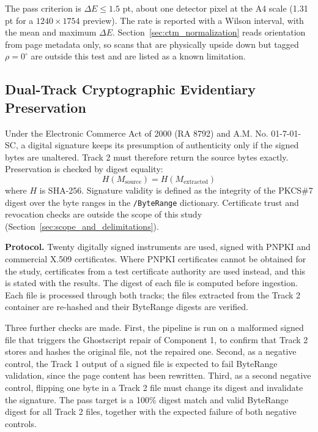 The pass criterion is $\Delta E \le 1.5$ pt, about one detector pixel at the A4 scale (1.31 pt for a $1240 \times 1754$ preview). The rate is reported with a Wilson interval, with the mean and maximum $\Delta E$. Section~\ref{sec:ctm_normalization} reads orientation from page metadata only, so scans that are physically upside down but tagged $\rho=0^\circ$ are outside this test and are listed as a known limitation.

\subsection{Dual-Track Cryptographic Evidentiary Preservation}
\label{sec:eval_crypto_preservation}

Under the Electronic Commerce Act of 2000 (RA 8792) and A.M. No. 01-7-01-SC, a digital signature keeps its presumption of authenticity only if the signed bytes are unaltered. Track 2 must therefore return the source bytes exactly. Preservation is checked by digest equality:
\begin{equation}
\label{eq:preservation_digest}
H(M_{\text{source}})=H(M_{\text{extracted}})
\end{equation}
where $H$ is SHA-256. Signature validity is defined as the integrity of the PKCS\#7 digest over the byte ranges in the \texttt{/ByteRange} dictionary. Certificate trust and revocation checks are outside the scope of this study (Section~\ref{sec:scope_and_delimitations}).

\textbf{Protocol.} Twenty digitally signed instruments are used, signed with PNPKI and commercial X.509 certificates. Where PNPKI certificates cannot be obtained for the study, certificates from a test certificate authority are used instead, and this is stated with the results. The digest of each file is computed before ingestion. Each file is processed through both tracks; the files extracted from the Track 2 container are re-hashed and their ByteRange digests are verified.

Three further checks are made. First, the pipeline is run on a malformed signed file that triggers the Ghostscript repair of Component 1, to confirm that Track 2 stores and hashes the original file, not the repaired one. Second, as a negative control, the Track 1 output of a signed file is expected to fail ByteRange validation, since the page content has been rewritten. Third, as a second negative control, flipping one byte in a Track 2 file must change its digest and invalidate the signature. The pass target is a 100\% digest match and valid ByteRange digest for all Track 2 files, together with the expected failure of both negative controls.

